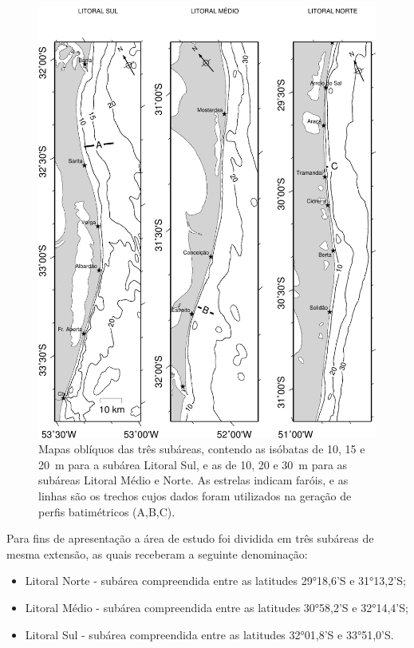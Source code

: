 \documentclass[a4paper,11pt,twoside,showtrims,onecolumn,openright,final]{memoir}
\begin{document}
\begin{figure}
\begin{center}
\includegraphics[width=\textwidth]{BATIMETRIA_MAPA}
\end{center}
\caption[Mapas oblíquos das três subáreas, contendo as isóbatas de 10, 15, 20 e 30~m]
	{Mapas oblíquos das três subáreas, contendo as isóbatas de 10, 15 e 20~m para 
         a subárea Litoral Sul, e as de 10, 20 e 30~m para as subáreas Litoral Médio e Norte. 
         As estrelas indicam faróis, e as linhas são os trechos cujos dados foram utilizados na 
         geração de perfis batimétricos (A,B,C).}
\label{fig:batimetria-fig1}
\end{figure}


Para fins de apresentação a área de estudo foi dividida em três subáreas de mesma extensão, 
as quais receberam a seguinte denominação:

\begin{itemize}

\item Litoral Norte - subárea compreendida entre as latitudes 29°18,6'S e 31°13,2'S;
\item Litoral Médio - subárea compreendida entre as latitudes 30°58,2'S e 32°14,4'S;
\item Litoral Sul - subárea compreendida entre as latitudes 32°01,8'S e 33°51,0'S.

\end{itemize}
\end{document}
